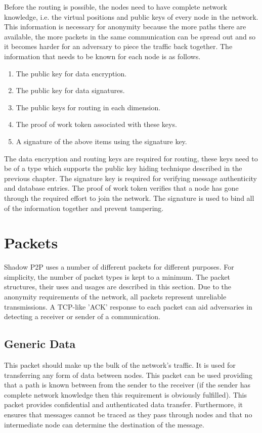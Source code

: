 \documentclass[ %
                    author={Luke Murray},
                supervisor={Dr. Simon Hollis},
                     title={Shadow Peer-to-Peer Networks},
                  subtitle={},
                    degree={MEng},
                      year={2013} ]{thesis}
\begin{document}
Before the routing is possible, the nodes need to have complete network knowledge, i.e. the virtual positions and public keys of every node in the network. This information is necessary for anonymity because the more paths there are available, the more packets in the same communication can be spread out and so it becomes harder for an adversary to piece the traffic back together. The information that needs to be known for each node is as follows.
\begin{enumerate}
\item The public key for data encryption.
\item The public key for data signatures.
\item The public keys for routing in each dimension.
\item The proof of work token associated with these keys.
\item A signature of the above items using the signature key.
\end{enumerate}
The data encryption and routing keys are required for routing, these keys need to be of a type which supports the public key hiding technique described in the previous chapter. The signature key is required for verifying message authenticity and database entries. The proof of work token verifies that a node has gone through the required effort to join the network. The signature is used to bind all of the information together and prevent tampering.

\section{Packets}

Shadow P2P uses a number of different packets for different purposes. For simplicity, the number of packet types is kept to a minimum. The packet structures, their uses and usages are described in this section. Due to the anonymity requirements of the network, all packets represent unreliable transmissions. A TCP-like 'ACK' response to each packet can aid adversaries in detecting a receiver or sender of a communication.

\subsection{Generic Data}

This packet should make up the bulk of the network's traffic. It is used for transferring any form of data between nodes. This packet can be used providing that a path is known between from the sender to the receiver (if the sender has complete network knowledge then this requirement is obviously fulfilled). This packet provides confidential and authenticated data transfer. Furthermore, it ensures that messages cannot be traced as they pass through nodes and that no intermediate node can determine the destination of the message.
\end{document}
